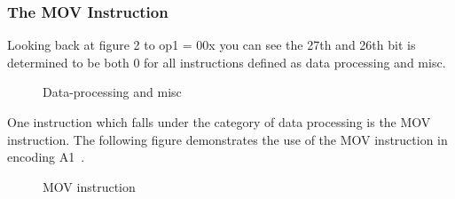 \documentclass[11pt]{report}
\begin{document}
\subsubsection{The MOV Instruction}
\begin{doublespace}
Looking back at figure 2 to op1 = 00x you can see the 27th and 26th bit is determined to be both 0 for all instructions defined as data processing and misc. 
\end{doublespace}
\begin{center}
\begin{figure}[H] 
\caption{Data-processing and misc}
\end{figure}
\end{center}
\begin{doublespace}
One instruction which falls under the category of data processing is the MOV instruction. The following figure demonstrates the use of the MOV instruction in encoding A1~\citep[A8-194]{referenceB}. 
\end{doublespace}

\begin{center}
\begin{figure}[H] 
\caption{MOV instruction}
\end{figure}
\end{center}
\end{document}
